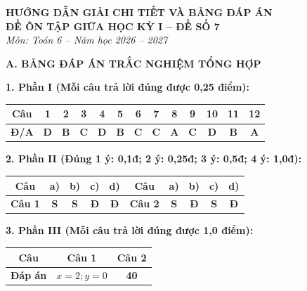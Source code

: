 \documentclass[12pt,a4paper]{article}
\begin{document}
\begin{center}
  \textbf{\Large HƯỚNG DẪN GIẢI CHI TIẾT VÀ BẢNG ĐÁP ÁN}\\
  \textbf{\large ĐỀ ÔN TẬP GIỮA HỌC KỲ I -- ĐỀ SỐ 7}\\
  \textit{Môn: Toán 6 -- Năm học 2026 -- 2027}
\end{center}
\vspace{2mm}

\noindent\textbf{\large A. BẢNG ĐÁP ÁN TRẮC NGHIỆM TỔNG HỢP}
\vspace{1.5mm}

\noindent\textbf{1. Phần I (Mỗi câu trả lời đúng được 0,25 điểm):}
\begin{center}
\begin{tabular}{|c|c|c|c|c|c|c|c|c|c|c|c|c|}
\hline
\textbf{Câu} & \textbf{1} & \textbf{2} & \textbf{3} & \textbf{4} & \textbf{5} & \textbf{6} & \textbf{7} & \textbf{8} & \textbf{9} & \textbf{10} & \textbf{11} & \textbf{12} \\
\hline
\textbf{Đ/A} & \textbf{D} & \textbf{B} & \textbf{C} & \textbf{D} & \textbf{B} & \textbf{C} & \textbf{C} & \textbf{A} & \textbf{C} & \textbf{D} & \textbf{B} & \textbf{A} \\
\hline
\end{tabular}
\end{center}
\vspace{1mm}

\noindent\textbf{2. Phần II (Đúng 1 ý: 0,1đ; 2 ý: 0,25đ; 3 ý: 0,5đ; 4 ý: 1,0đ):}
\begin{center}
\begin{tabular}{|c|c|c|c|c||c|c|c|c|c|}
\hline
\textbf{Câu} & \textbf{a)} & \textbf{b)} & \textbf{c)} & \textbf{d)} & \textbf{Câu} & \textbf{a)} & \textbf{b)} & \textbf{c)} & \textbf{d)} \\
\hline
\textbf{Câu 1} & \textbf{S} & \textbf{S} & \textbf{Đ} & \textbf{Đ} & \textbf{Câu 2} & \textbf{S} & \textbf{Đ} & \textbf{S} & \textbf{Đ} \\
\hline
\end{tabular}
\end{center}
\vspace{1mm}

\noindent\textbf{3. Phần III (Mỗi câu trả lời đúng được 1,0 điểm):}
\begin{center}
\begin{tabular}{|c|c|c|}
\hline
\textbf{Câu} & \textbf{Câu 1} & \textbf{Câu 2} \\
\hline
\textbf{Đáp án} & \textbf{$x = 2; y = 0$} & \textbf{40} \\
\hline
\end{tabular}
\end{center}
\vspace{3mm}
\end{document}
